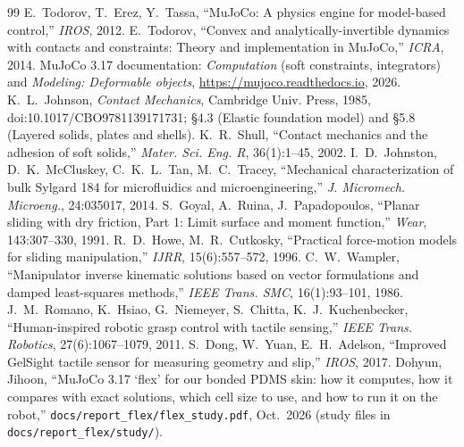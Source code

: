 \documentclass[10pt,twocolumn]{article}
\newcommand{\code}[1]{\texttt{\small #1}}
\begin{document}

{\footnotesize
\begin{thebibliography}{99}\setlength{\itemsep}{0pt}
 E.~Todorov, T.~Erez, Y.~Tassa, ``MuJoCo: A physics engine for model-based control,''
\emph{IROS}, 2012.
 E.~Todorov, ``Convex and analytically-invertible dynamics with contacts and
constraints: Theory and implementation in MuJoCo,'' \emph{ICRA}, 2014.
 MuJoCo 3.17 documentation: \emph{Computation} (soft constraints, integrators) and
\emph{Modeling: Deformable objects}, \url{https://mujoco.readthedocs.io}, 2026.
 K.~L.~Johnson, \emph{Contact Mechanics}, Cambridge Univ. Press, 1985, doi:10.1017/CBO9781139171731; \S4.3 (Elastic foundation model) and \S5.8 (Layered solids, plates and shells).
 K.~R.~Shull, ``Contact mechanics and the adhesion of soft solids,'' \emph{Mater. Sci. Eng. R}, 36(1):1--45, 2002.
 I.~D.~Johnston, D.~K.~McCluskey, C.~K.~L.~Tan, M.~C.~Tracey, ``Mechanical characterization of bulk Sylgard 184 for microfluidics and microengineering,'' \emph{J. Micromech. Microeng.}, 24:035017, 2014.
 S.~Goyal, A.~Ruina, J.~Papadopoulos, ``Planar sliding with dry friction, Part 1: Limit surface
and moment function,'' \emph{Wear}, 143:307--330, 1991.
 R.~D.~Howe, M.~R.~Cutkosky, ``Practical force-motion models for sliding manipulation,''
\emph{IJRR}, 15(6):557--572, 1996.
 C.~W.~Wampler, ``Manipulator inverse kinematic solutions based on vector formulations and
damped least-squares methods,'' \emph{IEEE Trans. SMC}, 16(1):93--101, 1986.
 J.~M.~Romano, K.~Hsiao, G.~Niemeyer, S.~Chitta, K.~J.~Kuchenbecker, ``Human-inspired robotic grasp control with tactile sensing,'' \emph{IEEE Trans. Robotics}, 27(6):1067--1079, 2011.
 S.~Dong, W.~Yuan, E.~H.~Adelson, ``Improved GelSight tactile sensor for measuring geometry and
slip,'' \emph{IROS}, 2017.
 Dohyun, Jihoon, ``MuJoCo 3.17 `flex' for our bonded PDMS skin: how it computes, how it compares with exact solutions, which cell size to use, and how to run it on the robot,'' \code{docs/report\_flex/flex\_study.pdf}, Oct.~2026 (study files in \code{docs/report\_flex/study/}).

\end{thebibliography}}
\end{document}
